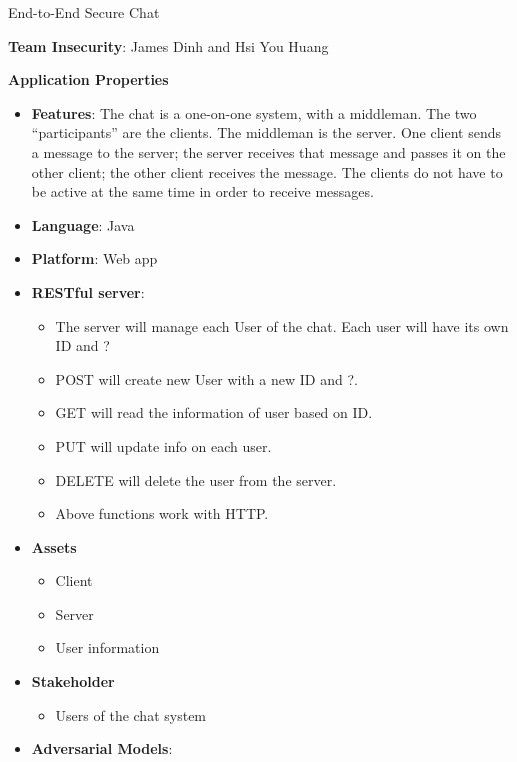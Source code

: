 \documentclass{article}
\begin{document}
End-to-End Secure Chat\newline

\textbf{Team Insecurity}: James Dinh and Hsi You Huang\newline

\textbf{Application Properties}\newline

\begin{itemize}
	\item \textbf{Features}: The chat is a one-on-one system, with a middleman. The two “participants” are the clients. The middleman is the server. One client sends a message to the server; the server receives that message and passes it on the other client; the other client receives the message. The clients do not have to be active at the same time in order to receive messages.
	\item \textbf{Language}: Java
    \item \textbf{Platform}: Web app
    \item \textbf{RESTful server}:
    	\begin{itemize}
    		\item The server will manage each User of the chat. Each user will have its own ID and ?
         	\item POST will create new User with a new ID and ?.
            \item GET will read the information of user based on ID.
            \item PUT will update info on each user.
            \item DELETE will delete the user from the server.
            \item Above functions work with HTTP.
        \end{itemize}
	\item \textbf{Assets}
    	\begin{itemize}
        	\item Client
            \item Server
            \item User information
        \end{itemize} 
    \item \textbf{Stakeholder}
    	\begin{itemize}
        	\item Users of the chat system
        \end{itemize}
    \item \textbf{Adversarial Models}:
    	\begin {itemize}

\end{itemize}
\end{itemize}
\end{document}
